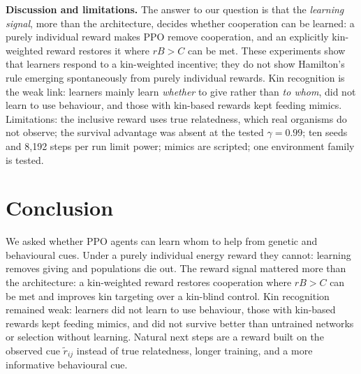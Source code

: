 \documentclass{article}
\begin{document}
\textbf{Discussion and limitations.} The answer to our question is that the \emph{learning signal}, more than the architecture, decides whether cooperation can be learned: a purely individual reward makes PPO remove cooperation, and an explicitly kin-weighted reward restores it where $rB>C$ can be met. These experiments show that learners respond to a kin-weighted incentive; they do not show Hamilton's rule emerging spontaneously from purely individual rewards. Kin recognition is the weak link: learners mainly learn \emph{whether} to give rather than \emph{to whom}, did not learn to use behaviour, and those with kin-based rewards kept feeding mimics. Limitations: the inclusive reward uses true relatedness, which real organisms do not observe; the survival advantage was absent at the tested $\gamma=0.99$; ten seeds and 8{,}192 steps per run limit power; mimics are scripted; one environment family is tested.

\section{Conclusion}
We asked whether PPO agents can learn whom to help from genetic and behavioural cues. Under a purely individual energy reward they cannot: learning removes giving and populations die out. The reward signal mattered more than the architecture: a kin-weighted reward restores cooperation where $rB>C$ can be met and improves kin targeting over a kin-blind control. Kin recognition remained weak: learners did not learn to use behaviour, those with kin-based rewards kept feeding mimics, and did not survive better than untrained networks or selection without learning. Natural next steps are a reward built on the observed cue $\tilde r_{ij}$ instead of true relatedness, longer training, and a more informative behavioural cue.

\end{document}
